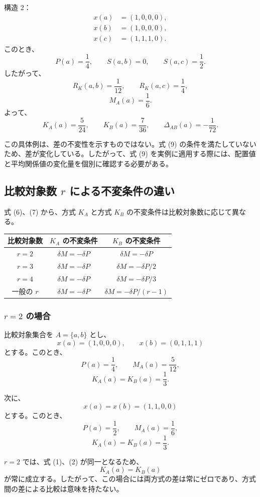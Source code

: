 \documentclass[a4paper,11pt]{ltjsarticle}
\begin{document}
構造 2：
\[
\begin{aligned}
x(a)&=(1,0,0,0),\\
x(b)&=(1,0,0,0),\\
x(c)&=(1,1,1,0).
\end{aligned}
\]
このとき、
\[
P(a)=\frac14,\qquad
S(a,b)=0,\qquad
S(a,c)=\frac12.
\]
したがって、
\[
R_K(a,b)=\frac1{12},\qquad
R_K(a,c)=\frac14,
\]
\[
M_A(a)=\frac16.
\]
よって、
\[
K_A(a)=\frac5{24},\qquad
K_B(a)=\frac7{36},\qquad
\Delta_{AB}(a)=-\frac1{72}.
\]

この具体例は、差の不変性を示すものではない。式 (9) の条件を満たしていないため、差が変化している。したがって、式 (9) を実例に適用する際には、配置値と平均関係値の変化量を個別に確認する必要がある。

\subsection{比較対象数 $r$ による不変条件の違い}

式 (6)、(7) から、方式 $K_A$ と方式 $K_B$ の不変条件は比較対象数に応じて異なる。

\begin{center}
\begin{tabular}{c|c|c}
\hline
比較対象数 & $K_A$ の不変条件 & $K_B$ の不変条件\\
\hline
$r=2$ & $\delta M=-\delta P$
      & $\delta M=-\delta P$\\
$r=3$ & $\delta M=-\delta P$
      & $\delta M=-\delta P/2$\\
$r=4$ & $\delta M=-\delta P$
      & $\delta M=-\delta P/3$\\
一般の $r$ & $\delta M=-\delta P$
            & $\delta M=-\delta P/(r-1)$\\
\hline
\end{tabular}
\end{center}

\subsubsection{$r=2$ の場合}

比較対象集合を $A=\{a,b\}$ とし、
\[
x(a)=(1,0,0,0),\qquad
x(b)=(0,1,1,1)
\]
とする。このとき、
\[
P(a)=\frac14,\qquad
M_A(a)=\frac5{12},
\]
\[
K_A(a)=K_B(a)=\frac13.
\]

次に、
\[
x(a)=x(b)=(1,1,0,0)
\]
とする。このとき、
\[
P(a)=\frac12,\qquad
M_A(a)=\frac16,
\]
\[
K_A(a)=K_B(a)=\frac13.
\]

$r=2$ では、式 (1)、(2) が同一となるため、
\[
K_A(a)=K_B(a)
\]
が常に成立する。したがって、この場合には両方式の差は常にゼロであり、方式間の差による比較は意味を持たない。
\end{document}
